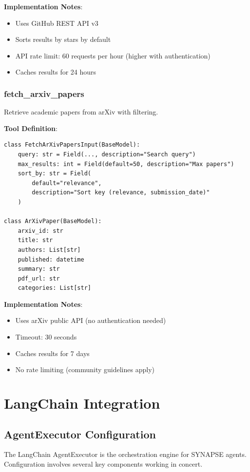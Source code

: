 \documentclass{report}
\begin{document}
\textbf{Implementation Notes}:
\begin{itemize}
    \item Uses GitHub REST API v3
    \item Sorts results by stars by default
    \item API rate limit: 60 requests per hour (higher with authentication)
    \item Caches results for 24 hours
\end{itemize}

\subsection{fetch\_arxiv\_papers}

Retrieve academic papers from arXiv with filtering.

\textbf{Tool Definition}:
\begin{lstlisting}
class FetchArXivPapersInput(BaseModel):
    query: str = Field(..., description="Search query")
    max_results: int = Field(default=50, description="Max papers")
    sort_by: str = Field(
        default="relevance",
        description="Sort key (relevance, submission_date)"
    )

class ArXivPaper(BaseModel):
    arxiv_id: str
    title: str
    authors: List[str]
    published: datetime
    summary: str
    pdf_url: str
    categories: List[str]
\end{lstlisting}

\textbf{Implementation Notes}:
\begin{itemize}
    \item Uses arXiv public API (no authentication needed)
    \item Timeout: 30 seconds
    \item Caches results for 7 days
    \item No rate limiting (community guidelines apply)
\end{itemize}

\chapter{LangChain Integration}

\section{AgentExecutor Configuration}

The LangChain AgentExecutor is the orchestration engine for SYNAPSE agents. Configuration involves several key components working in concert.
\end{document}
